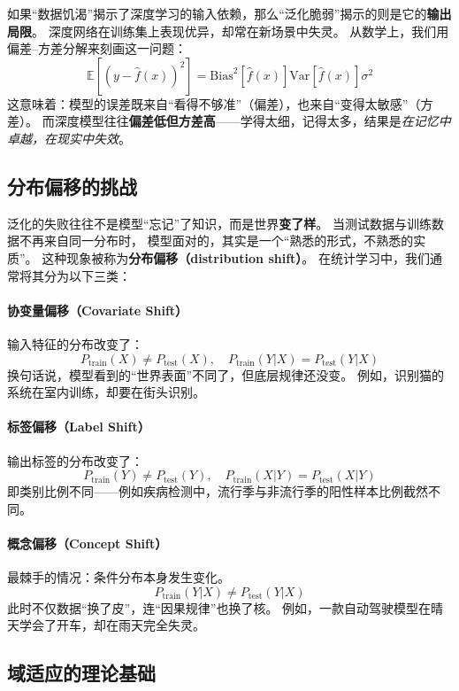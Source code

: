 如果“数据饥渴”揭示了深度学习的输入依赖，那么“泛化脆弱”揭示的则是它的\textbf{输出局限}。  
深度网络在训练集上表现优异，却常在新场景中失灵。  
从数学上，我们用偏差--方差分解来刻画这一问题：  
$$\mathbb{E}[(y - \hat{f}(x))^2] = \text{Bias}^2[\hat{f}(x)]  \text{Var}[\hat{f}(x)]  \sigma^2$$  
这意味着：模型的误差既来自“看得不够准”（偏差），也来自“变得太敏感”（方差）。  
而深度模型往往\textbf{偏差低但方差高}——学得太细，记得太多，结果是\textit{在记忆中卓越，在现实中失效}。

\subsection{分布偏移的挑战}

泛化的失败往往不是模型“忘记”了知识，而是世界\textbf{变了样}。  
当测试数据与训练数据不再来自同一分布时，  
模型面对的，其实是一个“熟悉的形式，不熟悉的实质”。  
这种现象被称为\textbf{分布偏移（distribution shift）}。  
在统计学习中，我们通常将其分为以下三类：

\paragraph{协变量偏移（Covariate Shift）}  
输入特征的分布改变了：  
$$P_{\text{train}}(X) \neq P_{\text{test}}(X), \quad P_{\text{train}}(Y|X) = P_{\text{test}}(Y|X)$$  
换句话说，模型看到的“世界表面”不同了，但底层规律还没变。  
例如，识别猫的系统在室内训练，却要在街头识别。

\paragraph{标签偏移（Label Shift）}  
输出标签的分布改变了：  
$$P_{\text{train}}(Y) \neq P_{\text{test}}(Y), \quad P_{\text{train}}(X|Y) = P_{\text{test}}(X|Y)$$  
即类别比例不同——例如疾病检测中，流行季与非流行季的阳性样本比例截然不同。

\paragraph{概念偏移（Concept Shift）}  
最棘手的情况：条件分布本身发生变化。  
$$P_{\text{train}}(Y|X) \neq P_{\text{test}}(Y|X)$$  
此时不仅数据“换了皮”，连“因果规律”也换了核。  
例如，一款自动驾驶模型在晴天学会了开车，却在雨天完全失灵。

\subsection{域适应的理论基础}

